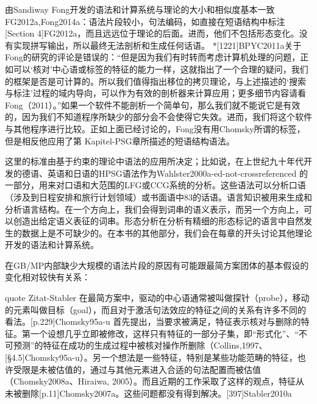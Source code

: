  





















由Sandiway Fong开发的语法和计算系统与理论的大小和相似度基本一致FG2012a,Fong2014a：语法片段较小，句法编码，如直接在短语结构中标注[Section 4]FG2012a，而且远远位于理论的后面。进而，他们不包括形态变化。没有实现拼写输出，所以最终无法剖析和生成任何话语。 
*[1221]BPYC2011a关于Fong的研究的评论是错误的：“但是因为我们有时转而考虑计算机处理的问题，正如可以‘核对’中心语或标签的特征的能力一样，这就指出了一个合理的疑问，我们的框架是否是可计算的。所以我们值得指出移位的拷贝理论，与上述描述的‘搜索与标注’过程的域内导向，可以作为有效的剖析器来计算应用；更多细节内容请看Fong（2011）。”如果一个软件不能剖析一个简单句，那么我们就不能说它是有效的，因为我们不知道程序所缺少的部分会不会使得它失效。进而，我们将这个软件与其他程序进行比较。正如上面已经讨论的，Fong没有用Chomsky所谓的标签，但是相反他应用了第 Kapitel-PSG章所描述的短语结构语法。











 






这里的标准由基于约束的理论中语法的应用所决定；比如说，在上世纪九十年代开发的德语、英语和日语的HPSG语法作为Wahlster2000a-ed-not-crossreferenced 的一部分，用来对口语和大范围的LFG或CCG系统的分析。这些语法可以分析口语（涉及到日程安排和旅行计划领域）或书面语中83的话语。语言知识被用来生成和分析语言结构。在一个方向上，我们会得到词串的语义表示，而另一个方向上，可以创造出给定语义表征的词串。形态分析在分析有精细的形态标记的语言中自然发生的数据上是不可缺少的。在本书的其他部分，我们会在每章的开头讨论其他理论开发的语法和计算系统。










在GB/MP内部缺少大规模的语法片段的原因有可能跟最简方案团体的基本假设的变化相对较快有关系：


quote
Zitat-Stabler
在最简方案中，驱动的中心语通常被叫做探针（probe），移动的元素叫做目标（goal），而且对于激活句法效应的特征之间的关系有许多不同的看法。[p.229]Chomsky95a-u 首先提出，当要求被满足，特征表示核对与删除的特征。第一个设想几乎立即被修改，这样只有特征的一部分子集，即“形式化”、“不可预测”的特征在成功的生成过程中被核对操作所删除（Collins,1997、[§4.5]Chomsky95a-u）。另一个想法是一些特征，特别是某些功能范畴的特征，也许受限是未被估值的，通过与其他元素进入合适的句法配置而被估值（Chomsky2008a、Hiraiwa, 2005）。而且近期的工作采取了这样的观点，特征从未被删除[p.11]Chomsky2007a。这些问题都没有得到解决。[397]Stabler2010a 











